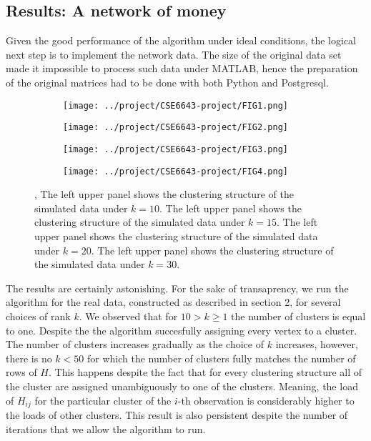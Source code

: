 \documentclass[11pt,letter]{article}%
\numberwithin{equation}{section}
\begin{document}
\subsection{Results: A network of money}


Given the good performance of the algorithm under ideal conditions, the logical next step is to implement the network data. The size of the original data set made it impossible to process such data under MATLAB, hence the preparation of the original matrices had to be done with both Python and Postgresql. 

\begin{figure}[!h]
    \centering
    \begin{subfigure}[b]{0.45\textwidth}
            \centering
            \texttt{[image: ../project/CSE6643-project/FIG1.png]}
    \label{fig:fig1}
    \end{subfigure}
\begin{subfigure}[b]{0.45\textwidth}
            \centering
            \texttt{[image: ../project/CSE6643-project/FIG2.png]}
    \label{fig:fig2}
    \end{subfigure}
    \begin{subfigure}[b]{0.45\textwidth}
            \centering
            \texttt{[image: ../project/CSE6643-project/FIG3.png]}
    \label{fig:fig3}
    \end{subfigure}
    \begin{subfigure}[b]{0.45\textwidth}
            \centering
            \texttt{[image: ../project/CSE6643-project/FIG4.png]}
    \label{fig:fig4}
    \end{subfigure}
    \caption{\protect{}, The left upper panel shows the clustering structure of the simulated data under $k=10$. The left upper panel shows the clustering structure of the simulated data under $k=15$. The left upper panel shows the clustering structure of the simulated data under $k=20$. The left upper panel shows the clustering structure of the simulated data under $k=30$.}
\end{figure}

The results are certainly astonishing. For the sake of transaprency, we run the algorithm for the real data, constructed as described in section 2, for several choices of rank $k$. We observed that for $10> k\geq1$   the number of clusters is equal to one. Despite the the algorithm succesfully assigning every vertex to a cluster. The number of clusters increases gradually as the choice of $k$ increases, however, there is no $k<50$ for which the number of clusters fully matches the number of rows of $H$. This happens despite the fact that for every clustering structure all of the cluster are assigned unambiguously to one of the clusters. Meaning, the load of $H_{ij}$ for the particular cluster of the $i$-th observation is considerably higher to the loads of other clusters. This result is also persistent despite the number of iterations that we allow the algorithm to run.
\end{document}
